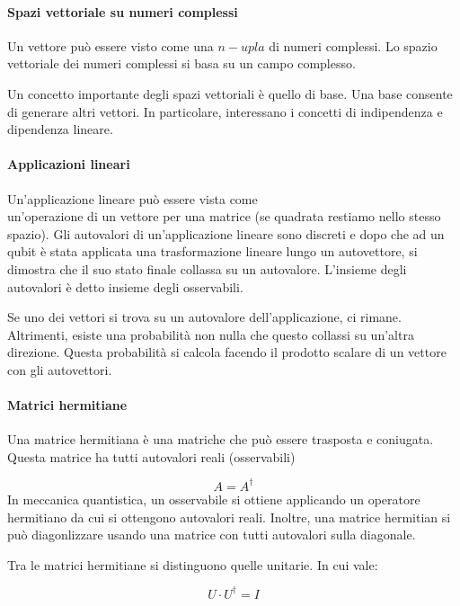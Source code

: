 \documentclass{article}
\begin{document}
\paragraph{Spazi vettoriale su numeri complessi}
Un vettore può essere visto come una $n-upla$ di numeri complessi. Lo spazio vettoriale dei numeri complessi si basa su un campo complesso.

Un concetto importante degli spazi vettoriali è quello di base. Una base consente di generare altri vettori. In particolare, interessano i concetti di indipendenza e dipendenza lineare.

\paragraph{Applicazioni lineari}
Un'applicazione lineare può essere vista come\\ un'operazione di un vettore per una matrice (se quadrata restiamo nello stesso spazio). 
Gli autovalori di un'applicazione lineare sono discreti e dopo che ad un qubit è stata applicata una trasformazione lineare lungo un autovettore, si dimostra che il suo stato finale collassa su un autovalore. L'insieme degli autovalori è detto insieme degli osservabili.

Se uno dei vettori si trova su un autovalore dell'applicazione, ci rimane. Altrimenti, esiste una probabilità non nulla che questo collassi su un'altra direzione. Questa probabilità si calcola facendo il prodotto scalare di un vettore con gli autovettori.

\paragraph{Matrici hermitiane}
Una matrice hermitiana è una matriche che può essere trasposta e coniugata. Questa matrice ha tutti autovalori reali (osservabili)

\begin{equation*}
    A = A^\dagger
\end{equation*}
In meccanica quantistica, un osservabile si ottiene applicando un operatore hermitiano da cui si ottengono autovalori reali. Inoltre, una matrice hermitian si può diagonlizzare usando una matrice con tutti autovalori sulla diagonale.

Tra le matrici hermitiane si distinguono quelle unitarie. In cui vale:

\begin{equation*}
    U\cdot U^\dagger = I
\end{equation*}
\end{document}
